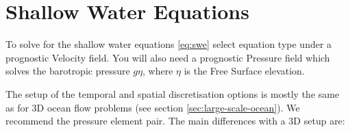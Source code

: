 
\section{Shallow Water Equations} \label{sec:shallow_water_equations}
To solve for the shallow water equations \eqref{eq:swe} select equation type
 under a prognostic Velocity field. You will
also need a prognostic Pressure field which solves the barotropic pressure
$g\eta$, where $\eta$ is the Free Surface elevation. 

The setup of the temporal
and spatial discretisation options is mostly the same as for 3D ocean
flow problems (see section \ref{sec:large-scale-ocean}). We recommend the \PoDGPt pressure element pair. The
main differences with a 3D setup are:
